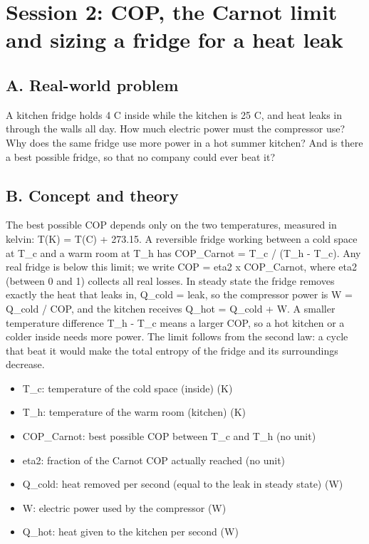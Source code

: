 \documentclass[11pt,a4paper]{article}
\begin{document}
\section{Session 2: COP, the Carnot limit and sizing a fridge for a heat leak}

\subsection*{A. Real-world problem}
A kitchen fridge holds 4 C inside while the kitchen is 25 C, and heat leaks in through the walls all day. How much electric power must the compressor use? Why does the same fridge use more power in a hot summer kitchen? And is there a best possible fridge, so that no company could ever beat it?

\subsection*{B. Concept and theory}
The best possible COP depends only on the two temperatures, measured in kelvin: T(K) = T(C) + 273.15. A reversible fridge working between a cold space at T\_c and a warm room at T\_h has COP\_Carnot = T\_c / (T\_h - T\_c). Any real fridge is below this limit; we write COP = eta2 x COP\_Carnot, where eta2 (between 0 and 1) collects all real losses. In steady state the fridge removes exactly the heat that leaks in, Q\_cold = leak, so the compressor power is W = Q\_cold / COP, and the kitchen receives Q\_hot = Q\_cold + W. A smaller temperature difference T\_h - T\_c means a larger COP, so a hot kitchen or a colder inside needs more power. The limit follows from the second law: a cycle that beat it would make the total entropy of the fridge and its surroundings decrease.

\begin{itemize}[nosep]
\item T\_c: temperature of the cold space (inside) (K)
\item T\_h: temperature of the warm room (kitchen) (K)
\item COP\_Carnot: best possible COP between T\_c and T\_h (no unit)
\item eta2: fraction of the Carnot COP actually reached (no unit)
\item Q\_cold: heat removed per second (equal to the leak in steady state) (W)
\item W: electric power used by the compressor (W)
\item Q\_hot: heat given to the kitchen per second (W)
\end{itemize}
\end{document}
